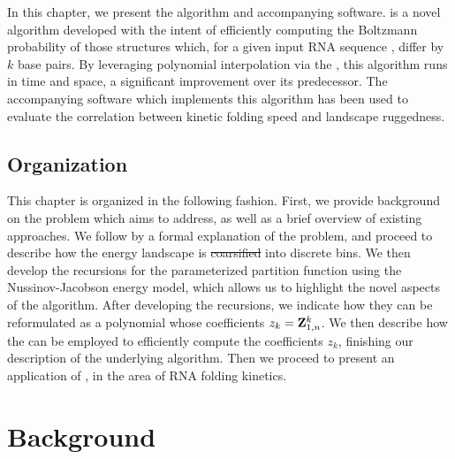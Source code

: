 \documentclass[11pt, oneside]{Thesis} %
\providecommand{\DIFadd}[1]{{\protect\color{blue}\uwave{#1}}} %
\providecommand{\DIFdel}[1]{{\protect\color{red}\sout{#1}}}                      %
\providecommand{\DIFaddbegin}{} %
\providecommand{\DIFaddend}{} %
\providecommand{\DIFdelbegin}{} %
\providecommand{\DIFdelend}{} %
\begin{document}
In this chapter, we present the \fftbor algorithm and accompanying software.
\fftbor is a novel algorithm developed with the intent of efficiently computing
the Boltzmann probability of those structures which, for a given input RNA
sequence \seq, differ by $k$ base pairs. By leveraging polynomial interpolation
via the \fft, this algorithm runs in  time and
 space, a significant improvement over its predecessor. The accompanying
software which implements this algorithm has been used to evaluate the
correlation between kinetic folding speed and landscape ruggedness.

\subsection{Organization}
\label{subsec:fftbor:org}

This chapter is organized in the following fashion. First, we provide
background on
the problem which \fftbor aims to address, as well as a brief overview of
existing approaches. We follow by a formal explanation of the problem, and
proceed to describe how the energy landscape is \DIFdelbegin \DIFdel{coarsified }\DIFdelend \DIFaddbegin \DIFadd{partitioned }\DIFaddend into discrete bins.
We then develop the recursions for the parameterized partition function using
the Nussinov-Jacobson energy model, which allows us to highlight the novel aspects
of the algorithm. After developing the recursions, we indicate how they can be
reformulated as a polynomial whose coefficients $z_k={\bf Z}^{k}_{1,n}$. We then
describe how the \fft can be employed to efficiently compute the coefficients
$z_k$, finishing our description of the underlying algorithm. Then we proceed
to present an application of \fftbor, in the area of RNA folding kinetics.

\section{Background}
\label{sec:fftbor:bkgrnd}
\end{document}
